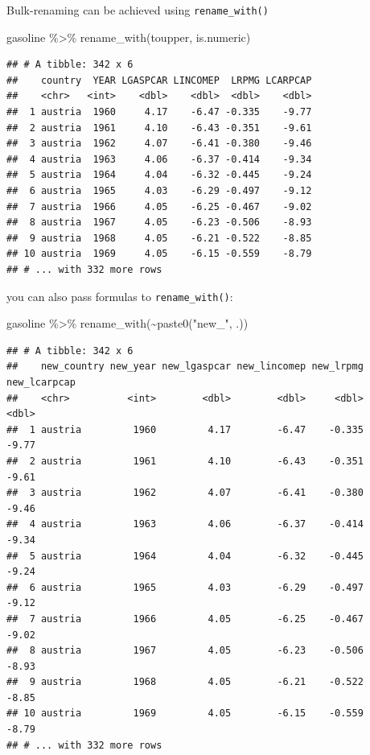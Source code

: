 \documentclass[
]{article}
\newenvironment{Shaded}{\begin{snugshade}}{\end{snugshade}}
\newcommand{\FunctionTok}[1]{\textcolor[rgb]{0.00,0.00,0.00}{#1}}
\newcommand{\NormalTok}[1]{#1}
\newcommand{\SpecialCharTok}[1]{\textcolor[rgb]{0.00,0.00,0.00}{#1}}
\newcommand{\StringTok}[1]{\textcolor[rgb]{0.31,0.60,0.02}{#1}}
\begin{document}
Bulk-renaming can be achieved using \texttt{rename\_with()}

\begin{Shaded}
\begin{Highlighting}[]
\NormalTok{gasoline }\SpecialCharTok{\%\textgreater{}\%}
  \FunctionTok{rename\_with}\NormalTok{(toupper, is.numeric)}
\end{Highlighting}
\end{Shaded}

\begin{verbatim}
## # A tibble: 342 x 6
##    country  YEAR LGASPCAR LINCOMEP  LRPMG LCARPCAP
##    <chr>   <int>    <dbl>    <dbl>  <dbl>    <dbl>
##  1 austria  1960     4.17    -6.47 -0.335    -9.77
##  2 austria  1961     4.10    -6.43 -0.351    -9.61
##  3 austria  1962     4.07    -6.41 -0.380    -9.46
##  4 austria  1963     4.06    -6.37 -0.414    -9.34
##  5 austria  1964     4.04    -6.32 -0.445    -9.24
##  6 austria  1965     4.03    -6.29 -0.497    -9.12
##  7 austria  1966     4.05    -6.25 -0.467    -9.02
##  8 austria  1967     4.05    -6.23 -0.506    -8.93
##  9 austria  1968     4.05    -6.21 -0.522    -8.85
## 10 austria  1969     4.05    -6.15 -0.559    -8.79
## # ... with 332 more rows
\end{verbatim}

you can also pass formulas to \texttt{rename\_with()}:

\begin{Shaded}
\begin{Highlighting}[]
\NormalTok{gasoline }\SpecialCharTok{\%\textgreater{}\%}  
  \FunctionTok{rename\_with}\NormalTok{(}\SpecialCharTok{\textasciitilde{}}\FunctionTok{paste0}\NormalTok{(}\StringTok{"new\_"}\NormalTok{, .))}
\end{Highlighting}
\end{Shaded}

\begin{verbatim}
## # A tibble: 342 x 6
##    new_country new_year new_lgaspcar new_lincomep new_lrpmg new_lcarpcap
##    <chr>          <int>        <dbl>        <dbl>     <dbl>        <dbl>
##  1 austria         1960         4.17        -6.47    -0.335        -9.77
##  2 austria         1961         4.10        -6.43    -0.351        -9.61
##  3 austria         1962         4.07        -6.41    -0.380        -9.46
##  4 austria         1963         4.06        -6.37    -0.414        -9.34
##  5 austria         1964         4.04        -6.32    -0.445        -9.24
##  6 austria         1965         4.03        -6.29    -0.497        -9.12
##  7 austria         1966         4.05        -6.25    -0.467        -9.02
##  8 austria         1967         4.05        -6.23    -0.506        -8.93
##  9 austria         1968         4.05        -6.21    -0.522        -8.85
## 10 austria         1969         4.05        -6.15    -0.559        -8.79
## # ... with 332 more rows
\end{verbatim}
\end{document}

